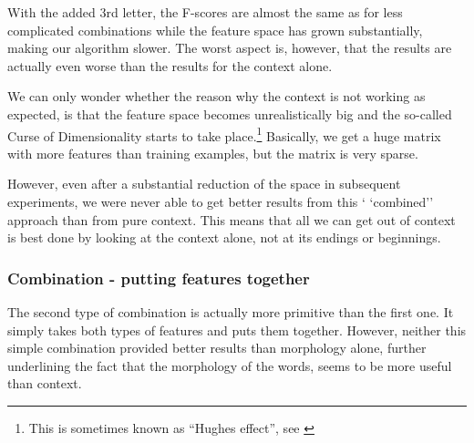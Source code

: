 \documentclass[letterpaper]{article}
\begin{document}
With the added 3rd letter, the F-scores are almost the same as for less complicated combinations while the feature space has grown substantially, making our algorithm slower. The worst aspect is, however, that the results are actually even worse than the results for the context alone.

We can only wonder whether the reason why the context is not working as expected, is that the feature space becomes unrealistically big and the so-called Curse of Dimensionality starts to take place.\footnote{This is sometimes known as ``Hughes effect'', see \cite{hughes:1968}} Basically, we get a huge matrix with more features than training examples, but the matrix is very sparse.
 
However, even after a substantial reduction of the space in subsequent experiments, we were never able to get better results from this `
`combined'' approach than from pure context. This means that all we can get out of context 
is best done by looking at the context alone, not at its endings or beginnings.


















\subsubsection{Combination - putting features together}
The second type of combination is actually more primitive than the first one. It simply takes both types of features and puts them together. 
However, neither this simple combination provided better results than morphology alone, 
further underlining the fact that the morphology of the words, 
seems to be more useful than context.
\end{document}
